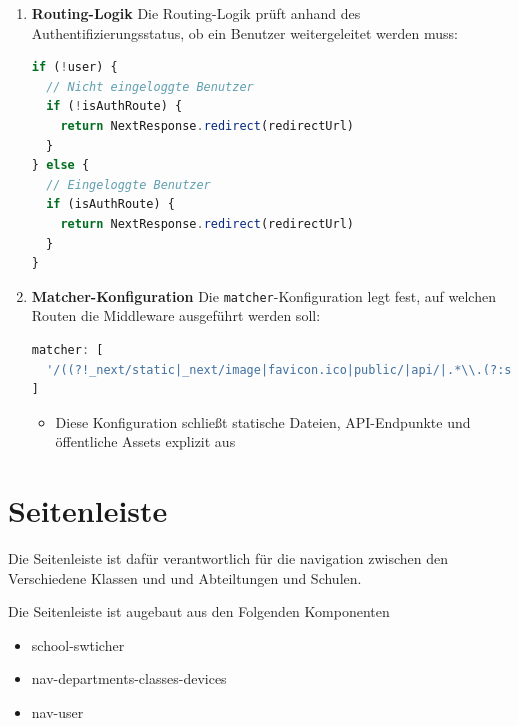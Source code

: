 \begin{inhalt}
\begin{enumerate}[label=\textbf{\arabic*.}]
  \item \textbf{Routing-Logik}
  Die Routing-Logik prüft anhand des Authentifizierungsstatus, ob ein Benutzer weitergeleitet werden muss:

  \begin{lstlisting}[language=TypeScript]
if (!user) {
  // Nicht eingeloggte Benutzer
  if (!isAuthRoute) {
    return NextResponse.redirect(redirectUrl)
  }
} else {
  // Eingeloggte Benutzer
  if (isAuthRoute) {
    return NextResponse.redirect(redirectUrl)
  }
}
  \end{lstlisting}

  \item \textbf{Matcher-Konfiguration}
  Die \texttt{matcher}-Konfiguration legt fest, auf welchen Routen die Middleware ausgeführt werden soll:

\begin{lstlisting}[language=TypeScript]
matcher: [
  '/((?!_next/static|_next/image|favicon.ico|public/|api/|.*\\.(?:svg|png|jpg|jpeg|gif|webp|js|css)$).*)',
]
\end{lstlisting}
  \begin{itemize}
    \item Diese Konfiguration schließt statische Dateien, API-Endpunkte und öffentliche Assets explizit aus
  \end{itemize}
\end{enumerate}






\clearpage

\newpage

\section{Seitenleiste}

Die Seitenleiste ist dafür verantwortlich für die navigation zwischen den Verschiedene Klassen und und Abteiltungen und Schulen.

Die Seitenleiste ist augebaut aus den Folgenden Komponenten

\begin{itemize}
    \item school-swticher
    \item nav-departments-classes-devices
    \item nav-user
\end{itemize}



\end{inhalt}
